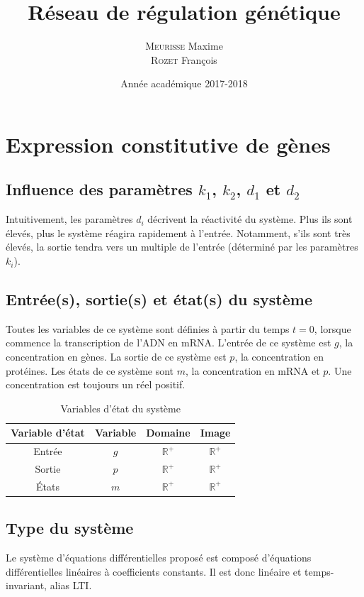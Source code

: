 \documentclass[a4paper, 12pt]{article}
\title{Réseau de régulation génétique}
\author{\textsc{Meurisse} Maxime\\\textsc{Rozet} François\\}
\date{Année académique 2017-2018}
\begin{document}
	
	\section{Expression constitutive de gènes}
	\subsection{Influence des paramètres ${k}_{1}$, ${k}_{2}$, ${d}_{1}$ et ${d}_{2}$}
	Intuitivement, les paramètres ${d}_{i}$ décrivent la réactivité du système. Plus ils sont élevés, plus le système réagira rapidement à l'entrée. Notamment, s'ils sont très élevés, la sortie tendra vers un multiple de l'entrée (déterminé par les paramètres ${k}_{i}$).
	\subsection{Entrée(s), sortie(s) et état(s) du système}
	Toutes les variables de ce système sont définies à partir du temps $t = 0$, \cad lorsque commence la transcription de l'ADN en mRNA.
	L’entrée de ce système est $g$, la concentration en gènes.
	La sortie de ce système est $p$, la concentration en protéines.
	Les états de ce système sont $m$, la concentration en mRNA et $p$.
	Une concentration est toujours un réel positif.
	\begin{table}[H]
		\centering
		\begin{tabular}{| c | c | c | c |}
			\hline
			\textbf{Variable d'état} & \textbf{Variable} & \textbf{Domaine} & \textbf{Image}\\
			\hline
			\hline
			Entrée & $g$ & $\mathbb{R}^{+}$ & $\mathbb{R}^{+}$\\
			\hline
			Sortie & \multirow{2}{*}{$p$} & \multirow{2}{*}{$\mathbb{R}^{+}$} & \multirow{2}{*}{$\mathbb{R}^{+}$}\\
			\cline{1-1}
			\multirow{2}{*}{\'{E}tats} &&&\\
			\cline{2-4}
			& $m$ & $\mathbb{R}^{+}$ & $\mathbb{R}^{+}$\\
			\hline
		\end{tabular}
		\caption{Variables d'état du système}
	\end{table}
	\subsection{Type du système}
	Le système d'équations différentielles proposé est composé d'équations différentielles linéaires à coefficients constants. Il est donc linéaire et temps-invariant, alias LTI.
\end{document}
